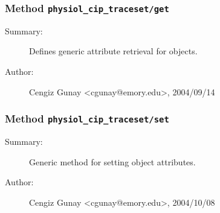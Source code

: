 \subsubsection[Method \texttt{get}]{Method \texttt{physiol\_cip\_traceset/get}}%
%
\label{ref_physiol_cip_traceset__get}%
\hypertarget{ref_physiol_cip_traceset__get}{}%
\begin{description}
\item[Summary:]Defines generic attribute retrieval for objects.
%
%
%
%
%
%
%
\item[Author:]%
Cengiz Gunay <cgunay@emory.edu>, 2004/09/14%
\end{description}
\methodline%
\subsubsection[Method \texttt{set}]{Method \texttt{physiol\_cip\_traceset/set}}%
%
\label{ref_physiol_cip_traceset__set}%
\hypertarget{ref_physiol_cip_traceset__set}{}%
\begin{description}
\item[Summary:]Generic method for setting object attributes.
%
%
%
%
%
%
%
\item[Author:]%
Cengiz Gunay <cgunay@emory.edu>, 2004/10/08%
\end{description}
\methodline%
